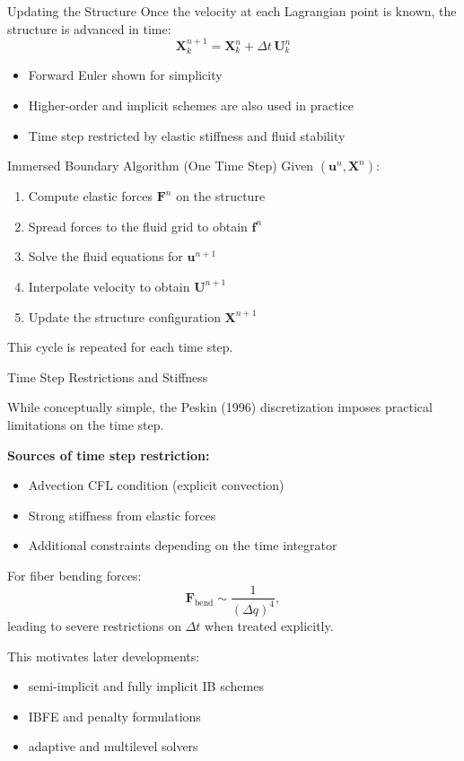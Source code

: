 \documentclass{beamer}
\begin{document}
\begin{frame}{Updating the Structure}
\small
Once the velocity at each Lagrangian point is known,
the structure is advanced in time:
\[
\mathbf{X}_k^{n+1}
=
\mathbf{X}_k^n
+
\Delta t\, \mathbf{U}_k^n
\]

\medskip
\begin{itemize}
    \item Forward Euler shown for simplicity
    \item Higher-order and implicit schemes are also used in practice
    \item Time step restricted by elastic stiffness and fluid stability
\end{itemize}
\end{frame}

\begin{frame}{Immersed Boundary Algorithm (One Time Step)}
\small
Given $(\mathbf{u}^n, \mathbf{X}^n)$:

\begin{enumerate}
    \item Compute elastic forces $\mathbf{F}^n$ on the structure
    \item Spread forces to the fluid grid to obtain $\mathbf{f}^n$
    \item Solve the fluid equations for $\mathbf{u}^{n+1}$
    \item Interpolate velocity to obtain $\mathbf{U}^{n+1}$
    \item Update the structure configuration $\mathbf{X}^{n+1}$
\end{enumerate}

\medskip
This cycle is repeated for each time step.
\end{frame}

\begin{frame}{Time Step Restrictions and Stiffness}
\small

While conceptually simple, the Peskin (1996) discretization
imposes practical limitations on the time step.

\medskip
\textbf{Sources of time step restriction:}
\begin{itemize}
    \item Advection CFL condition (explicit convection)
    \item Strong stiffness from elastic forces
    \item Additional constraints depending on the time integrator
\end{itemize}


\medskip
For fiber bending forces:
\[
\mathbf{F}_{\text{bend}} \sim \frac{1}{(\Delta q)^4},
\]
leading to severe restrictions on $\Delta t$ when treated explicitly.

\medskip
This motivates later developments:
\begin{itemize}
    \item semi-implicit and fully implicit IB schemes
    \item IBFE and penalty formulations
    \item adaptive and multilevel solvers
\end{itemize}

\end{frame}
\end{document}
